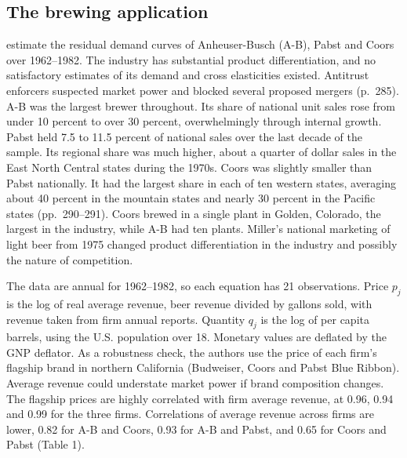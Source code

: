 \subsection{The brewing application}\label{sec:03-bb-brewing}

 \citet{BakerBresnahan1988} estimate the residual demand curves of Anheuser-Busch (A-B),
Pabst and Coors over 1962--1982. The industry has substantial product differentiation, and no satisfactory
estimates of its demand and cross elasticities existed. Antitrust enforcers suspected market power and
blocked several proposed mergers (p.~285). A-B was the largest brewer throughout. Its share of national unit
sales rose from under 10 percent to over 30 percent, overwhelmingly through internal growth. Pabst held 7.5 to
11.5 percent of national sales over the last decade of the sample. Its regional share was much higher, about a
quarter of dollar sales in the East North Central states during the 1970s. Coors was slightly smaller than
Pabst nationally. It had the largest share in each of ten western states, averaging about 40 percent in the
mountain states and nearly 30 percent in the Pacific states (pp.~290--291). Coors brewed in a single plant in
Golden, Colorado, the largest in the industry, while A-B had ten plants. Miller's national marketing of light
beer from 1975 changed product differentiation in the industry and possibly the nature of competition.

 The data are annual for 1962--1982, so each equation has 21 observations.
Price $p_j$ is the log of real average revenue, beer revenue divided by gallons sold, with revenue taken from
firm annual reports. Quantity $q_j$ is the log of per capita barrels, using the U.S. population over 18.
Monetary values are deflated by the GNP deflator. As a robustness check, the authors use the price of each firm's flagship brand
in northern California (Budweiser, Coors and Pabst Blue Ribbon). Average revenue could understate market power
if brand composition changes. The flagship prices are highly correlated with firm average revenue, at 0.96,
0.94 and 0.99 for the three firms. Correlations of average revenue across firms are lower, 0.82 for A-B and
Coors, 0.93 for A-B and Pabst, and 0.65 for Coors and Pabst (Table 1).


